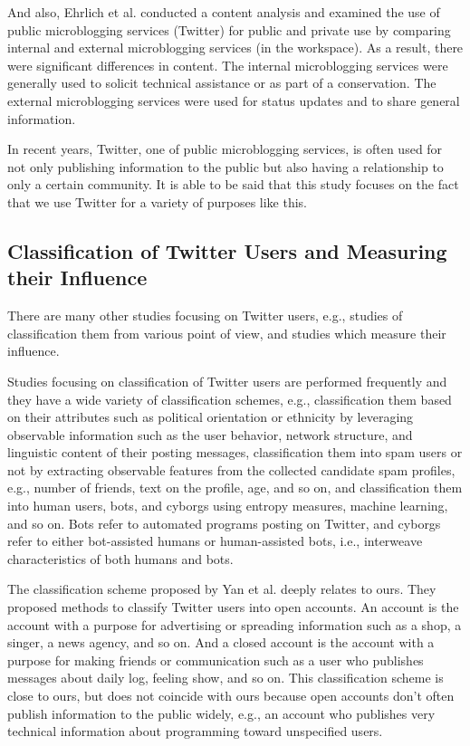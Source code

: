 And also, Ehrlich et al.\cite{ehrlich2010microblogging} conducted a
content analysis and examined the use of public microblogging services
(Twitter) for public and private use by comparing internal and external
microblogging services (in the workspace).  As a result, there were
significant differences in content.  The internal microblogging services
were generally used to solicit technical assistance or as part of a
conservation.  The external microblogging services were used for status
updates and to share general information.

In recent years, Twitter, one of public microblogging services, is often
used for not only publishing information to the public but also having a
relationship to only a certain community.  It is able to be said that
this study focuses on the fact that we use Twitter for a variety of
purposes like this.

\subsection{Classification of Twitter Users and Measuring their Influence}
\label{subsec:Twitter User}

There are many other studies focusing on Twitter users, e.g., studies of
classification them from various point of view, and studies which measure
their influence.

Studies focusing on classification of Twitter users are performed
frequently and they have a wide variety of classification schemes, e.g.,
classification them based on their attributes such as political
orientation or ethnicity by leveraging observable information such as
the user behavior, network structure, and linguistic content of their
posting messages\cite{pennacchiotti2011machine}, classification them
into spam users or not by extracting observable features from the
collected candidate spam profiles, e.g., number of friends, text on the
profile, age, and so on\cite{lee2010social}, and classification them
into human users, bots, and cyborgs using entropy measures, machine
learning, and so on\cite{chu2010tweeting}.  Bots refer to automated
programs posting on Twitter, and cyborgs refer to either bot-assisted
humans or human-assisted bots, i.e., interweave characteristics of both
humans and bots.

The classification scheme proposed by Yan et
al.\cite{yan2013classifying} deeply relates to ours.  They proposed
methods to classify Twitter users into open accounts.  An account is the
account with a purpose for advertising or spreading information such as
a shop, a singer, a news agency, and so on.  And a closed account is the
account with a purpose for making friends or communication such as a
user who publishes messages about daily log, feeling show, and so on.
This classification scheme is close to ours, but does not coincide with
ours because open accounts don't often publish information to the public
widely, e.g., an account who publishes very technical information about
programming toward unspecified users.

